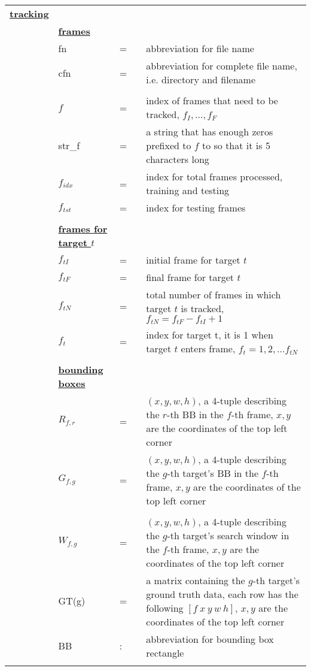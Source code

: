 \documentclass{article}
\begin{document}
\begin{longtable}{llllp{3in}}
\textbf{\color{red} \underline{tracking}}&&&&\\
&\textbf{\underline{frames}}&&&	\\
&fn 						&=&& abbreviation for file name\\
&cfn 						&=&& abbreviation for complete file name, i.e. directory and filename\\\\

&$f$ 						&=&&  index of frames that need to be tracked, $f_I, \ldots, f_F$\\
&str\_f 						&=&&  a string that has enough zeros prefixed to $f$ to so that it is 5 characters long\\
&$f_{idx}$ 				&=&&  index for total frames processed, training and testing\\ 
&$f_{tst}$ 					&=&&  index for testing frames\\ \\

&\textbf{\underline{frames for target $t$}}&&&	\\
&$f_{tI}$ 					&=&& initial frame for target $t$\\
&$f_{tF}$ 					&=&& final frame for target $t$\\
&$f_{tN}$ 					&=&&  total number of frames in which target $t$ is tracked, $f_{tN}=f_{tF} - f_{tI} + 1$\\
&$f_t$ 						&=&&  index for target t, it is 1 when target $t$ enters frame, $f_t = 1, 2, ... f_{tN}$ \\ \\



&\textbf{\underline{bounding boxes}}\\	
&$R_{f,r}$ 				&=&& $(x, y, w, h)$, a 4-tuple describing the $r$-th BB in the $f$-th frame, $x, y$ are the coordinates of the top left corner\\
&$G_{f,g}$ 				&=&& $(x, y, w, h)$, a 4-tuple describing the $g$-th target's BB in the $f$-th frame, $x, y$ are the coordinates of the top left corner\\ \\
&$W_{f, g}$ 				&=&& $(x, y, w, h)$, a 4-tuple describing the $g$-th target's search window in the $f$-th frame, $x, y$ are the coordinates of the top left corner\\

&GT(g) 					&=&&  a matrix containing the $g$-th target's ground truth data, each row has the following $[f \  x \ y \ w \ h]$, $x, y$ are the coordinates of the top left corner\\
&BB 						&:&&  abbreviation for bounding box rectangle\\ \\



\end{longtable}
\end{document}
